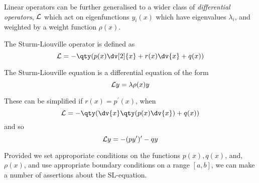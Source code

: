 Linear operators can be further generalised to a wider class of
\emph{differential operators}, ${\cal L}$ which act on eigenfunctions
$y_i(x)$ which have eigenvalues $\lambda_i$, and weighted by a weight
function $\rho(x)$.

\begin{definition}
  The Sturm-Liouville operator is defined as 
  \[ {\cal L} = - \qty( p(x) \dv[2]{x} + r(x) \dv{x} + q(x) ) \]
\end{definition}

\begin{definition}
  The Sturm-Liouville equation is a differential equation of the form
  \[ {\cal L} y = \lambda \rho(x) y \]
\end{definition}

These can be simplified if $r(x) = p^{\prime}(x)$, when
\[ {\cal L} = - \qty( \dv{x} \qty( p(x) \dv{x} ) + q(x) ) \]
and so
\[ {\cal L} y = - (py^{\prime})^{\prime} - qy \]
 
Provided we set approporiate conditions on the functions $p(x), q(x)$,
and, $\rho(x)$, and use appropriate boundary conditions on a range
$[a,b]$, we can make a number of assertions about the SL-equation.

